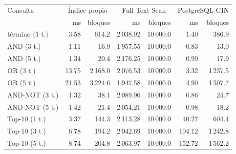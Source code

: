 \begin{tabular}{lrrrrrr}
\hline
Consulta & \multicolumn{2}{c}{Índice propio} & \multicolumn{2}{c}{Full Text Scan} & \multicolumn{2}{c}{PostgreSQL GIN} \\
 & ms & bloques & ms & bloques & ms & bloques \\
\hline
término (1 t.) & 3.58 & 614.2 & 2\,038.92 & 10\,000.0 & 1.40 & 386.9 \\
AND (3 t.) & 1.11 & 16.9 & 1\,957.55 & 10\,000.0 & 0.83 & 13.0 \\
AND (5 t.) & 1.34 & 20.4 & 2\,176.25 & 10\,000.0 & 0.99 & 17.9 \\
OR (3 t.) & 13.75 & 2\,168.0 & 2\,076.53 & 10\,000.0 & 3.32 & 1\,237.5 \\
OR (5 t.) & 21.53 & 3\,224.6 & 1\,947.58 & 10\,000.0 & 4.90 & 1\,507.7 \\
AND-NOT (3 t.) & 1.32 & 38.1 & 2\,089.96 & 10\,000.0 & 0.86 & 24.7 \\
AND-NOT (5 t.) & 1.42 & 21.4 & 2\,054.21 & 10\,000.0 & 0.98 & 18.2 \\
Top-10 (1 t.) & 3.37 & 144.3 & 2\,113.28 & 10\,000.0 & 40.27 & 604.4 \\
Top-10 (3 t.) & 6.78 & 194.2 & 2\,042.69 & 10\,000.0 & 104.12 & 1\,242.8 \\
Top-10 (5 t.) & 8.74 & 204.8 & 2\,063.97 & 10\,000.0 & 152.72 & 1\,562.2 \\
\hline
\end{tabular}
